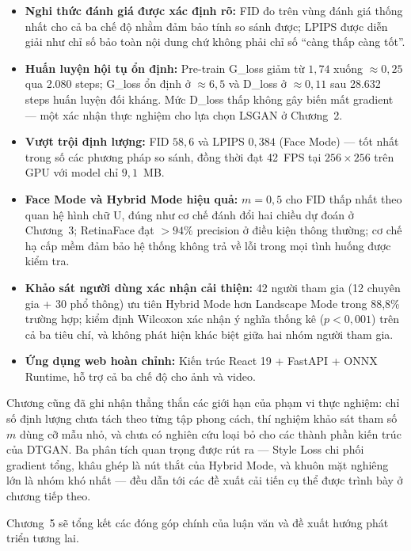 \begin{itemize}
    \item \textbf{Nghi thức đánh giá được xác định rõ:} FID đo trên vùng đánh giá thống nhất cho cả ba chế độ nhằm đảm bảo tính so sánh được; LPIPS được diễn giải như chỉ số bảo toàn nội dung chứ không phải chỉ số ``càng thấp càng tốt''.
    \item \textbf{Huấn luyện hội tụ ổn định:} Pre-train G\_loss giảm từ $1{,}74$ xuống $\approx 0{,}25$ qua 2.080 steps; G\_loss ổn định ở $\approx 6{,}5$ và D\_loss ở $\approx 0{,}11$ sau 28.632 steps huấn luyện đối kháng. Mức D\_loss thấp không gây biến mất gradient --- một xác nhận thực nghiệm cho lựa chọn LSGAN ở Chương~2.
    \item \textbf{Vượt trội định lượng:} FID $58{,}6$ và LPIPS $0{,}384$ (Face Mode) --- tốt nhất trong số các phương pháp so sánh, đồng thời đạt 42~FPS tại $256\times256$ trên GPU với model chỉ $9{,}1$~MB.
    \item \textbf{Face Mode và Hybrid Mode hiệu quả:} $m = 0{,}5$ cho FID thấp nhất theo quan hệ hình chữ U, đúng như cơ chế đánh đổi hai chiều dự đoán ở Chương~3; RetinaFace đạt $>94\%$ precision ở điều kiện thông thường; cơ chế hạ cấp mềm đảm bảo hệ thống không trả về lỗi trong mọi tình huống được kiểm tra.
    \item \textbf{Khảo sát người dùng xác nhận cải thiện:} 42 người tham gia (12 chuyên gia + 30 phổ thông) ưu tiên Hybrid Mode hơn Landscape Mode trong 88,8\% trường hợp; kiểm định Wilcoxon xác nhận ý nghĩa thống kê ($p < 0{,}001$) trên cả ba tiêu chí, và không phát hiện khác biệt giữa hai nhóm người tham gia.
    \item \textbf{Ứng dụng web hoàn chỉnh:} Kiến trúc React 19 + FastAPI + ONNX Runtime, hỗ trợ cả ba chế độ cho ảnh và video.
\end{itemize}

Chương cũng đã ghi nhận thẳng thắn các giới hạn của phạm vi thực nghiệm: chỉ số định lượng chưa tách theo từng tập phong cách, thí nghiệm khảo sát tham số $m$ dùng cỡ mẫu nhỏ, và chưa có nghiên cứu loại bỏ cho các thành phần kiến trúc của DTGAN. Ba phân tích quan trọng được rút ra --- Style Loss chi phối gradient tổng, khâu ghép là nút thắt của Hybrid Mode, và khuôn mặt nghiêng lớn là nhóm khó nhất --- đều dẫn tới các đề xuất cải tiến cụ thể được trình bày ở chương tiếp theo.

Chương~5 sẽ tổng kết các đóng góp chính của luận văn và đề xuất hướng phát triển tương lai.